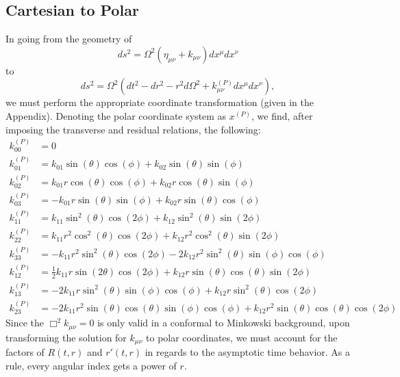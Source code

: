 \documentclass[10pt,letterpaper]{article}
\begin{document}
\subsection*{Cartesian to Polar}
In going from the geometry of 
\begin{equation}
ds^2 = \Omega^2 (\eta_{\mu\nu}+k_{\mu\nu})dx^\mu dx^\nu
\end{equation}
to
\begin{equation}
ds^2 = \Omega^2 (dt^2-dr^2 - r^2 d\Omega^2+ k^{(P)}_{\mu\nu}dx^\mu dx^\nu),
\end{equation}
we must perform the appropriate coordinate transformation (given in the Appendix). Denoting the polar coordinate system as $x^{(P)}$, we find, after imposing the transverse and residual relations, the following:
\begin{align}
k^{(P)}_{00} &= 0\nonumber\\
k^{(P)}_{01} &= k_{01} \sin (\theta ) \cos (\phi )+k_{02} \sin (\theta ) \sin (\phi )\nonumber\\
k^{(P)}_{02} &= k_{01} r \cos (\theta ) \cos (\phi )+k_{02} r \cos (\theta ) \sin (\phi )\nonumber\\
k^{(P)}_{03} &= -k_{01} r \sin (\theta ) \sin (\phi )+k_{02} r \sin (\theta ) \cos (\phi )\nonumber\\
k^{(P)}_{11} &= k_{11} \sin ^2(\theta ) \cos (2 \phi )+k_{12} \sin ^2(\theta ) \sin (2 \phi )\nonumber\\
k^{(P)}_{22} &= k_{11} r^2 \cos ^2(\theta ) \cos (2 \phi )+k_{12} r^2 \cos ^2(\theta ) \sin (2 \phi )\nonumber\\
k^{(P)}_{33} &= -k_{11} r^2 \sin ^2(\theta ) \cos (2 \phi )-2 k_{12} r^2 \sin ^2(\theta ) \sin (\phi ) \cos (\phi )\nonumber\\
k^{(P)}_{12} &= \frac{1}{2} k_{11} r \sin (2 \theta ) \cos (2 \phi )+k_{12} r \sin (\theta ) \cos (\theta ) \sin (2 \phi )\nonumber\\
k^{(P)}_{13} &=-2 k_{11} r \sin ^2(\theta ) \sin (\phi ) \cos (\phi )+ k_{12} r \sin ^2(\theta ) \cos (2 \phi )\nonumber\\
k^{(P)}_{23} &= -2 k_{11} r^2 \sin (\theta ) \cos (\theta ) \sin (\phi ) \cos (\phi )+k_{12} r^2 \sin (\theta ) \cos (\theta ) \cos (2 \phi )
\end{align}
Since the $\Box^2 k_{\mu\nu} =0$ is only valid in a conformal to Minkowski background, upon transforming the solution for $k_{\mu\nu}$ to polar coordinates, we must account for the factors of $R(t,r)$ and $r'(t,r)$ in regards to the asymptotic time behavior. As a rule, every angular index gets a power of $r$. 
\end{document}

